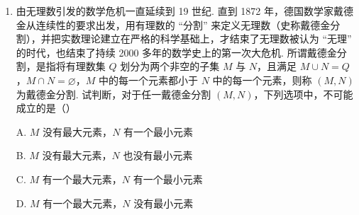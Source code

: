 \documentclass[a4paper,11pt]{article}
\begin{document}
\begin{enumerate}
\keepwithprev
A. $e_+^{x_1}+e_+^{x_2}\geqslant2e_+^{\frac{x_1+x_2}{2}}$\qquad B. $e_+^{x_1+x_2}=e_+^{x_1}\cdot e_+^{x_2}$\qquad C. $e_+^{x_1-x_2}=\dfrac{e_+^{x_1}}{e_+^{x_2}}$\qquad D. $e_+^{x_1x_2}\leqslant\left(e_+^{x_1}\right)^{x_2}$

\ifanswer
\solbegin
{}
\solend
\fi

\item 由无理数引发的数学危机一直延续到 19 世纪. 直到 1872 年，德国数学家戴德金从连续性的要求出发，用有理数的 “分割” 来定义无理数（史称戴德金分割），并把实数理论建立在严格的科学基础上，才结束了无理数被认为 “无理” 的时代，也结束了持续 2000 多年的数学史上的第一次大危机. 所谓戴德金分割，是指将有理数集 $Q$ 划分为两个非空的子集 $M$ 与 $N$，且满足 $M\cup N=Q$，$M\cap N=\varnothing$，$M$ 中的每一个元素都小于 $N$ 中的每一个元素，则称 $(M,N)$ 为戴德金分割. 试判断，对于任一戴德金分割 $(M,N)$，下列选项中，不可能成立的是\mbox{（\quad）}

\keepwithprev
A. $M$ 没有最大元素，$N$ 有一个最小元素

B. $M$ 没有最大元素，$N$ 也没有最小元素

C. $M$ 有一个最大元素，$N$ 有一个最小元素

D. $M$ 有一个最大元素，$N$ 没有最小元素

\ifanswer
\solbegin
{}
\solend
\fi

\end{enumerate}

\end{document}
